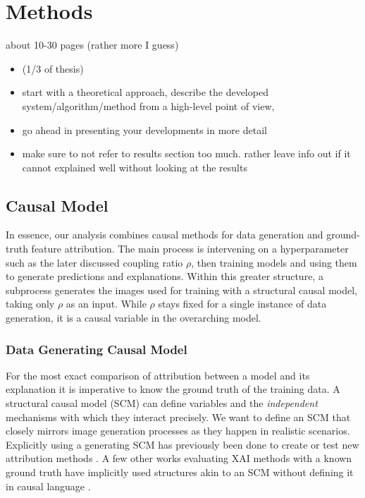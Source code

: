 \chapter{Methods}\label{chapter:method}

{ \color{red}

    about 10-30 pages (rather more I guess)

    \begin{itemize}
        \item (1/3 of thesis)
        \item start with a theoretical approach, describe the developed system/algorithm/method from a high-level point of view,
        \item go ahead in presenting your developments in more detail
        \item make sure to not refer to results section too much. rather leave info out if it cannot explained well without looking at the results
    \end{itemize}
}

\section{Causal Model}
In essence, our analysis combines causal methods for data generation and ground-truth feature attribution. 
The main process is intervening on a hyperparameter such as the later discussed coupling ratio $\rho$, then training models and using them to generate predictions and explanations. 
Within this greater structure, a subprocess generates the images used for training with a structural causal model, taking only $\rho$ as an input. While $\rho$ stays fixed for a single instance of data generation, it is a causal variable in the overarching model. 

\subsection{Data Generating Causal Model}
For the most exact comparison of attribution between a model and its explanation it is imperative to know the ground truth of the training data. A structural causal model (SCM) can define variables and the \textit{independent} mechanisms with which they interact precisely. We want to define an SCM that closely mirrors image generation processes as they happen in realistic scenarios. 
Explicitly using a generating SCM has previously been done to create or test new attribution methods \cite{Parafita2019, Wilming2023,Clark2023, Goyal2019, Reimers2019, Reimers2020}. A few other works evaluating XAI methods with a known ground truth have implicitly used structures akin to an SCM without defining it in causal language \cite{Kim2018, Yang2019,Arras2022}. 

